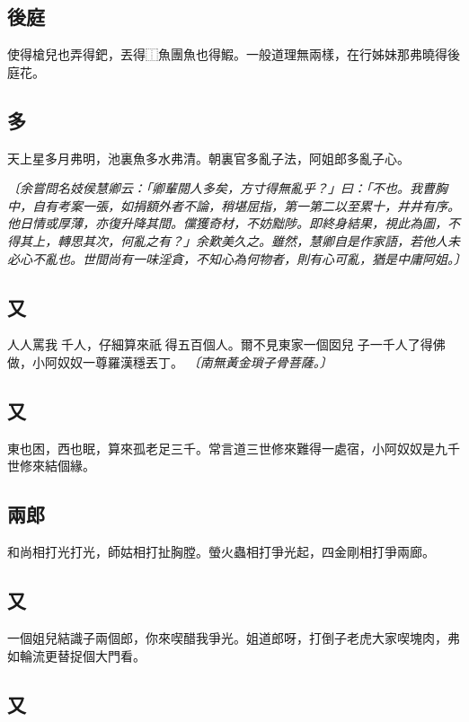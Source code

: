 \subsection*{後庭}

使得槍兒也弄得鈀，丟得⿰魚團魚也得鰕。一般道理無兩樣，在行姊妹那弗曉得後庭花。

\subsection*{多}

天上星多月弗明，池裏魚多水弗清。朝裏官多亂子法，阿姐郎多亂子心。

\textit{〔余嘗問名妓侯慧卿云：「卿輩閱人多矣，方寸得無亂乎？」曰：「不也。我曹胸中，自有考案一張，如捐額外者不論，稍堪屈指，第一第二以至累十，井井有序。他日情或厚薄，亦復升降其間。儻獲奇材，不妨黜陟。即終身結果，視此為圖，不得其上，轉思其次，何亂之有？」余歎美久之。雖然，慧卿自是作家語，若他人未必心不亂也。世間尚有一味淫貪，不知心為何物者，則有心可亂，猶是中庸阿姐。〕}

\subsection*{又}

人人罵我𣬿千人，仔細算來祇𣬿得五百個人。爾不見東家一個囡兒𣬿子一千人了得佛做，小阿奴奴一尊羅漢穩丟丁。
\textit{〔南無黃金瑣子骨菩薩。〕}

\subsection*{又}

東也困，西也眠，算來孤老足三千。常言道三世修來難得一處宿，小阿奴奴是九千世修來結個緣。

\subsection*{兩郎}

和尚相打光打光，師姑相打扯胸膛。螢火蟲相打爭光起，四金剛相打爭兩廊。

\subsection*{又}

一個姐兒結識子兩個郎，你來喫醋我爭光。姐道郎呀，打倒子老虎大家喫塊肉，弗如輪流更替捉個大門看。

\subsection*{又}

